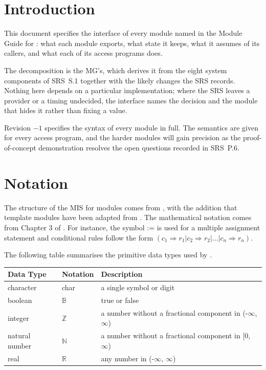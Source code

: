\documentclass[12pt, titlepage]{article}
\newcommand{\B}{\mathbb{B}}
\newcommand{\R}{\mathbb{R}}
\newcommand{\N}{\mathbb{N}}
\newcommand{\Zed}{\mathbb{Z}}
\begin{document}
\section{Introduction}

This document specifies the interface of every module named in the Module Guide
for \progname{}: what each module exports, what state it keeps, what it assumes
of its callers, and what each of its access programs does.

The decomposition is the MG's, which derives it from the eight system components
of SRS~S.1 together with the likely changes the SRS records. Nothing here
depends on a particular implementation; where the SRS leaves a provider or a
timing undecided, the interface names the decision and the module that hides it
rather than fixing a value.

Revision $-1$ specifies the syntax of every module in full. The semantics are
given for every access program, and the harder modules will gain precision as
the proof-of-concept demonstration resolves the open questions recorded in
SRS~P.6.

\section{Notation}

The structure of the MIS for modules comes from \citet{HoffmanAndStrooper1995},
with the addition that template modules have been adapted from
\cite{GhezziEtAl2003}. The mathematical notation comes from Chapter 3 of
\citet{HoffmanAndStrooper1995}. For instance, the symbol := is used for a
multiple assignment statement and conditional rules follow the form $(c_1
\Rightarrow r_1 | c_2 \Rightarrow r_2 | ... | c_n \Rightarrow r_n )$.

The following table summarises the primitive data types used by \progname.

\begin{center}
\renewcommand{\arraystretch}{1.2}
\noindent
\begin{tabular}{l l p{7.5cm}}
\toprule
\textbf{Data Type} & \textbf{Notation} & \textbf{Description}\\
\midrule
character & char & a single symbol or digit\\
boolean & $\B$ & true or false\\
integer & $\Zed$ & a number without a fractional component in (-$\infty$, $\infty$)\\
natural number & $\N$ & a number without a fractional component in [0, $\infty$)\\
real & $\R$ & any number in (-$\infty$, $\infty$)\\
\bottomrule
\end{tabular}
\end{center}
\end{document}

